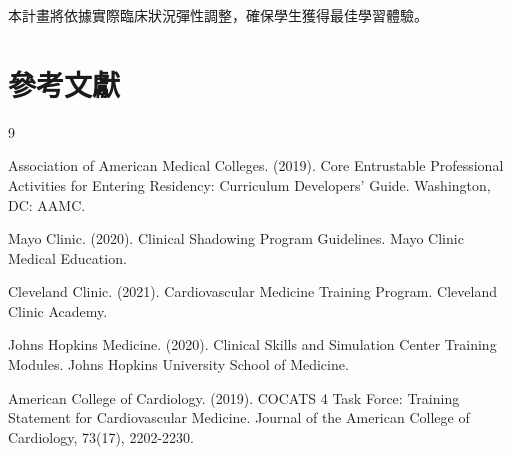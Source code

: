 \documentclass[12pt,a4paper]{article}
\newcommand{\note}[1]{
    \par
    \noindent
    \begin{tcolorbox}[
        colback=emergency_blue!5!white,
        colframe=emergency_blue,
        title=\textbf{重點提醒},
        fonttitle=\bfseries,
        boxrule=0.5pt,
        arc=3pt,
        left=6pt,
        right=6pt,
        top=6pt,
        bottom=6pt
    ]
    #1
    \end{tcolorbox}
}
\begin{document}
\note{
本計畫將依據實際臨床狀況彈性調整，確保學生獲得最佳學習體驗。
}

\newpage
\section{參考文獻}
\begin{thebibliography}{9}

Association of American Medical Colleges. (2019). Core Entrustable Professional Activities for Entering Residency: Curriculum Developers' Guide. Washington, DC: AAMC.

Mayo Clinic. (2020). Clinical Shadowing Program Guidelines. Mayo Clinic Medical Education.

Cleveland Clinic. (2021). Cardiovascular Medicine Training Program. Cleveland Clinic Academy.

Johns Hopkins Medicine. (2020). Clinical Skills and Simulation Center Training Modules. Johns Hopkins University School of Medicine.

American College of Cardiology. (2019). COCATS 4 Task Force: Training Statement for Cardiovascular Medicine. Journal of the American College of Cardiology, 73(17), 2202-2230.

\end{thebibliography}
\end{document}
